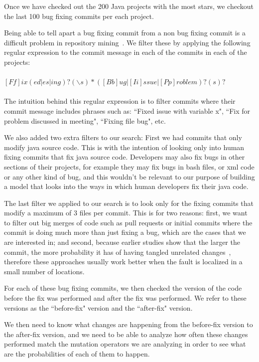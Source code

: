 \documentclass[conference]{IEEEtran}
\begin{document}
Once we have checked out the 200 Java projects with the most stars, we checkout 
the last 100 bug fixing commits per each project. 

Being able to tell apart a bug fixing commit from a non bug fixing commit is a difficult problem in repository mining~\cite{Bird09}. We filter these by applying the following regular expression to the commit message in each of the commits in each of the projects:
\\
\\
$[Ff]ix(ed|es|ing)?(\backslash s)*([Bb]ug|[Ii]ssue|[Pp]roblem)?(s)?$
\\
\\
The intuition behind this regular expression is to filter commits where their 
commit message includes phrases such as: ``Fixed issue with variable x", ``Fix for 
problem discussed in meeting", ``Fixing file bug", etc.

We also added two extra filters to our search: First we had commits that only 
modify java source code. This is with the intention of looking only into human 
fixing commits that fix java source code. Developers may also fix bugs in other 
sections of their projects, for example they may fix bugs in bash files, or xml 
code or any other kind of bug, and this wouldn't be relevant to our purpose of 
building a model that looks into the ways in which human developers fix their 
java code.

The last filter we applied to our search is to look only for the fixing commits 
that modify a maximum of 3 files per commit. This is for two reasons: first, we 
want to filter out big merges of code such as pull requests or initial commits 
where the commit is doing much more than just fixing a bug, which are the cases 
that we are interested in; and second, because earlier studies show that the larger the commit, the more probability it has of having tangled unrelated changes~\cite{Dias15,Herzig13,Matsuda15,Kawrykow11}, therefore these approaches usually work 
better when the fault is localized in a small number of locations.

For each of these bug fixing commits, we then checked the version of the code 
before the fix was performed and after the fix was performed. We refer to these 
versions as the ``before-fix" version and the ``after-fix" version.

We then need to know what changes are happening from the before-fix version to 
the after-fix version, and we need to be able to analyze how often these changes 
performed match the mutation operators we are analyzing in order to see what are 
the probabilities of each of them to happen.
\end{document}
